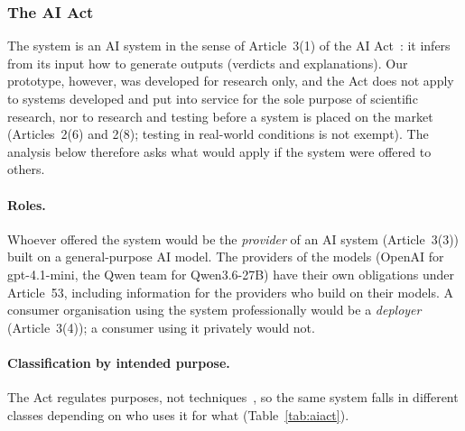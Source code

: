 \subsubsection{The AI Act}
\label{sec:ethics-aiact}

The system is an AI system in the sense of Article~3(1) of the AI Act~\citep{aiact2024}: it infers from its input how to generate outputs (verdicts and explanations). Our prototype, however, was developed for research only, and the Act does not apply to systems developed and put into service for the sole purpose of scientific research, nor to research and testing before a system is placed on the market (Articles~2(6) and 2(8); testing in real-world conditions is not exempt). The analysis below therefore asks what would apply if the system were offered to others.

\paragraph{Roles.} Whoever offered the system would be the \emph{provider} of an AI system (Article~3(3)) built on a general-purpose AI model. The providers of the models (OpenAI for gpt-4.1-mini, the Qwen team for Qwen3.6-27B) have their own obligations under Article~53, including information for the providers who build on their models. A consumer organisation using the system professionally would be a \emph{deployer} (Article~3(4)); a consumer using it privately would not.

\paragraph{Classification by intended purpose.} The Act regulates purposes, not techniques~\citep{slides_aiact}, so the same system falls in different classes depending on who uses it for what (Table~\ref{tab:aiact}).


